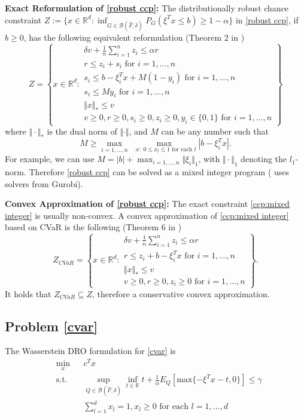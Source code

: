 \documentclass[11pt]{article}
\newcommand{\abs}[1]{\left \vert #1 \right\vert}
\newcommand{\R}{\mathbb{R}}
\begin{document}
\textbf{Exact Reformulation of \eqref{robust ccp}: }The distributionally robust chance constraint $Z:=\{x\in \R^d:\inf_{G\in \mathcal B(\hat F,\delta)}P_G(\xi^Tx\leq b)\geq 1-\alpha\}$ in \eqref{robust ccp}, if $b\geq 0$, has the following equivalent reformulation (Theorem 2 in \cite{xie2019distributionally})
\begin{equation}\label{ccp:mixed integer}
Z=\left\{x\in\R^d:\begin{array}{l}
\delta v+ \frac{1}{n}\sum_{i=1}^nz_i\leq \alpha r\\
r\leq z_i+s_i\text{ for }i=1,\ldots,n\\
s_i\leq b-\xi_i^Tx+M(1-y_i)\text{ for }i=1,\ldots,n\\
s_i\leq My_i\text{ for }i=1,\ldots,n\\
\Vert x\Vert_*\leq v\\
v\geq 0,r\geq 0, s_i\geq 0,z_i\geq 0,y_i\in\{0,1\}\text{ for }i=1,\ldots,n
\end{array}\right\}
\end{equation}
where $\Vert\cdot \Vert_*$ is the dual norm of $\Vert \cdot \Vert$, and $M$ can be any number such that
$$M\geq \max_{i=1,\ldots,n}\max_{\;\;x:\;0\leq x_l\leq 1\text{ for each }l}\abs{b-\xi_i^Tx}.$$
For example, we can use $M=\abs{b} + \max_{i=1,\ldots,n}\Vert \xi_i\Vert_1$, with $\Vert \cdot\Vert_1$ denoting the $l_1$-norm. Therefore \eqref{robust ccp} can be solved as a mixed integer program (\cite{xie2019distributionally} uses solvers from Gurobi).

\textbf{Convex Approximation of \eqref{robust ccp}: }The exact constraint \eqref{ccp:mixed integer} is usually non-convex. A convex approximation of \eqref{ccp:mixed integer} based on CVaR is the following (Theorem 6 in \cite{xie2019distributionally})
\begin{equation}\label{ccp:cvar}
Z_{CVaR}=\left\{x\in\R^d:\begin{array}{l}
\delta v+ \frac{1}{n}\sum_{i=1}^nz_i\leq \alpha r\\
r\leq z_i+b-\xi_i^Tx\text{ for }i=1,\ldots,n\\
\Vert x\Vert_*\leq v\\
v\geq 0,r\geq 0,z_i\geq 0\text{ for }i=1,\ldots,n
\end{array}\right\}.
\end{equation}
It holds that $Z_{CVaR}\subseteq Z$, therefore a conservative convex approximation.

\subsection{Problem \eqref{cvar}}
The Wasserstein DRO formulation for \eqref{cvar} is
\begin{equation}\label{robust cvar}
\begin{aligned}
& \underset{x}{\text{min}}
& & c^Tx \\
& \text{s.t.}
& &\sup_{Q\in\mathcal B(\hat F,\delta)} \inf_{t\in\R}t+\frac{1}{\alpha}E_Q[\text{max}\{-\xi^Tx-t,0\}]\leq \gamma\\
&& & \sum_{l=1}^dx_l=1,x_l\geq 0\text{ for each }l=1,\ldots,d
\end{aligned}
\end{equation}
\end{document}
